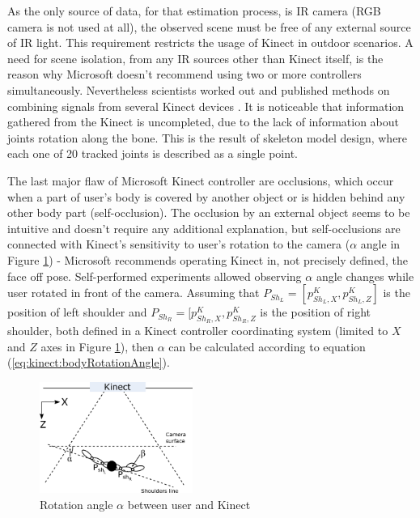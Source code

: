 \documentclass[sensors,article,submit,moreauthors,pdftex,10pt,a4paper]{mdpi}
\begin{document}
As the only source of data, for that estimation process, is IR camera (RGB camera is not used at all), the observed scene must be free of any external source of IR light. This requirement restricts the usage of Kinect in outdoor scenarios. A need for scene isolation, from any IR sources other than Kinect itself, is the reason why Microsoft doesn't recommend using two or more controllers simultaneously. Nevertheless scientists worked out and published methods on combining signals from several Kinect devices \cite{Asteriadis2013, Kitsikidis2011, Schroder2011}. It is noticeable that information gathered from the Kinect is uncompleted, due to the lack of information about joints rotation along the bone. This is the result of skeleton model design, where each one of 20 tracked joints is described as a single point.

The last major flaw of Microsoft Kinect controller are occlusions, which occur when a part of user’s body is covered by another object or is hidden behind any other body part (self-occlusion). The occlusion by an external object seems to be intuitive and doesn't require any additional explanation, but self-occlusions are connected with Kinect’s sensitivity to user’s rotation to the camera ($\alpha$ angle in Figure \ref{fig:kinect:rotationAngle}) - Microsoft recommends operating Kinect in, not precisely defined, the face off pose. Self-performed experiments allowed observing $\alpha$ angle changes while user rotated in front of the camera. Assuming that $P_{Sh_L} = [p^K_{{Sh}_L,X} , p^K_{{Sh}_L,Z}]$ is the position of left shoulder and $P_{Sh_R} = [p^K_{{Sh}_R,X} , p^K_{{Sh}_R,Z}$ is the position of right shoulder, both defined in a Kinect controller coordinating system (limited to $X$ and $Z$ axes in Figure \ref{fig:kinect:rotationAngle}), then $\alpha$ can be calculated according to equation (\ref{eq:kinect:bodyRotationAngle}).

\begin{figure}[H]
	\centering
	\includegraphics[width=5cm]{Figure3.png}
	\caption{Rotation angle $\alpha$ between user and Kinect}
	\label{fig:kinect:rotationAngle}
\end{figure}
\end{document}
